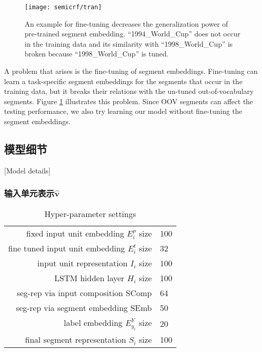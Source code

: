\begin{figure}[t]
	\centering
	\texttt{[image: semicrf/tran]}
	\caption{An example for fine-tuning decreases the generalization power of pre-trained segment embedding.
		``1994\_World\_Cup'' does not occur in the training data and its similarity with ``1998\_World\_Cup'' is broken because ``1998\_World\_Cup'' is tuned.}\label{fig:wo-ft}
\end{figure}

A problem that arises is the fine-tuning of segment embeddings.
Fine-tuning can learn a task-specific segment embeddings for the segments that occur in the training data, but it breaks their relations with the un-tuned out-of-vocabulary segments.
Figure \ref{fig:wo-ft} illustrates this problem.
Since OOV segments can affect the testing performance, we also try learning our model without fine-tuning the segment embeddings.

\subsection{模型细节}[Model details]


\subsubsection{输入单元表示$\mathbf{\hat{v}}$}
\begin{table}[t]
	\centering
	\begin{tabular}{r|l}
		\hline
		fixed input unit embedding $E^p_i$ size      & 100 \\
		fine tuned input unit embedding $E^t_i$ size & 32 \\
		input unit representation $I_i$ size       & 100 \\
		LSTM hidden layer $H_i$ size            & 100 \\
		seg-rep via input composition {\sc SComp} & 64 \\
		seg-rep via segment embedding {\sc SEmb} & 50 \\
		label embedding $E^Y_{y_i}$ size & 20 \\
		final segment representation $S_i$ size & 100 \\
		\hline
	\end{tabular}
	\caption{Hyper-parameter settings}
	\label{tbl:semicrf:hyper-parameter}
\end{table}

